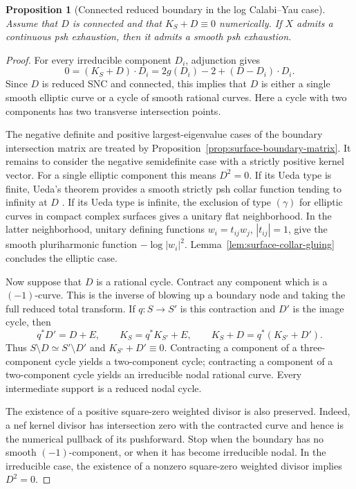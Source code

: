 \documentclass[11pt]{amsart}
\newtheorem{proposition}[theorem]{Proposition}
\theoremstyle{definition}
\theoremstyle{remark}
\numberwithin{equation}{section}
\begin{document}
\begin{proposition}[Connected reduced boundary in the log Calabi--Yau case]
\label{prop:surface-log-cy}
Assume that $D$ is connected and that $K_S+D\equiv0$ numerically.
If $X$ admits a continuous psh exhaustion, then it admits a smooth
psh exhaustion.
\end{proposition}

\begin{proof}
For every irreducible component $D_i$, adjunction gives
\begin{equation}\label{eq:surface-cy-adjunction}
 0=(K_S+D)\cdot D_i
   =2g(D_i)-2+(D-D_i)\cdot D_i.
\end{equation}
Since $D$ is reduced SNC and connected, this implies that $D$ is either
a single smooth elliptic curve or a cycle of smooth rational curves.
Here a cycle with two components has two transverse intersection points.

The negative definite and positive largest-eigenvalue cases of the
boundary intersection matrix are treated by
Proposition~\ref{prop:surface-boundary-matrix}.  It remains to consider
the negative semidefinite case with a strictly positive kernel vector.
For a single elliptic component this means $D^2=0$.
If its Ueda type is finite, Ueda's theorem provides a smooth strictly
psh collar function tending to infinity at $D$
\cite[Theorem~2.5]{CLPT2018}.  If its Ueda type is infinite, the
exclusion of type $(\gamma)$ for elliptic curves in compact complex
surfaces \cite[Theorem~1.6]{CFSTZ2026} gives a unitary flat
neighborhood.  In the latter neighborhood, unitary defining functions
$w_i=t_{ij}w_j$, $|t_{ij}|=1$, give the smooth pluriharmonic function
$-\log|w_i|^2$.  Lemma~\ref{lem:surface-collar-gluing} concludes
the elliptic case.

Now suppose that $D$ is a rational cycle.  Contract any component
which is a $(-1)$-curve.  This is the inverse of blowing up a boundary
node and taking the full reduced total transform.  If $q:S\to S'$
is this contraction and $D'$ is the image cycle, then
\[
 q^*D'=D+E,\qquad K_S=q^*K_{S'}+E,
 \qquad K_S+D=q^*(K_{S'}+D').
\]
Thus $S\setminus D\simeq S'\setminus D'$ and
$K_{S'}+D'\equiv0$.  Contracting a component of a three-component
cycle yields a two-component cycle; contracting a component of a
two-component cycle yields an irreducible nodal rational curve.
Every intermediate support is a reduced nodal cycle.

The existence of a positive square-zero weighted divisor is also
preserved.  Indeed, a nef kernel divisor has intersection zero with
the contracted curve and hence is the numerical pullback of its
pushforward.  Stop when the boundary has no smooth $(-1)$-component,
or when it has become irreducible nodal.  In the irreducible case,
the existence of a nonzero square-zero weighted divisor implies
$D^2=0$.


\end{proof}
\end{document}
